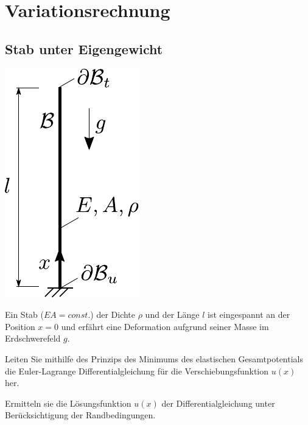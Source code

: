 \clearpage
\setcounter{page}{1}
\section{Variationsrechnung \label{sec:varrec}}



\subsection{Stab unter Eigengewicht}

\begin{minipage}{0.3\textwidth}
\center
\includegraphics[scale=0.8]{fig/ue2_stab_eigengewicht.pdf}
\end{minipage}
\hfill
\begin{minipage}{0.64\textwidth}
Ein Stab ($EA=const.$) der Dichte $\rho$ und der Länge $l$ ist eingespannt an der Position $x=0$ und erfährt eine Deformation aufgrund seiner Masse im Erdschwerefeld $g$.
\enab
\item Leiten Sie mithilfe des Prinzips des Minimums des elastischen Gesamtpotentials die Euler-Lagrange Differentialgleichung für die Verschiebungsfunktion $u(x)$ her.
\item Ermitteln sie die Lösungsfunktion $u(x)$ der Differentialgleichung unter Berücksichtigung der Randbedingungen.
\enae
\end{minipage}






